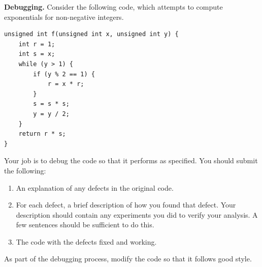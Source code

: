 \documentclass[answers]{exam}
\begin{document}
\begin{questions}


\question[12]
\textbf{Debugging.}
Consider the following code, which attempts to compute exponentials for non-negative integers. 
\begin{verbatim}
unsigned int f(unsigned int x, unsigned int y) {
    int r = 1;
    int s = x;
    while (y > 1) {
        if (y % 2 == 1) {
            r = x * r;
        }
        s = s * s;
        y = y / 2;
    }
    return r * s;
}
\end{verbatim}
Your job is to debug the code so that it performs as specified. 
You should submit the following:
\begin{enumerate}
\item An explanation of any defects in the original code. 
\item For each defect, a brief description of how you found that defect. 
Your description should contain any experiments you did to verify your analysis. 
A few sentences should be sufficient to do this. 
\item The code with the defects fixed and working. 
\end{enumerate}
As part of the debugging process, modify the code so that it follows good style. 

\end{questions}
\end{document}
